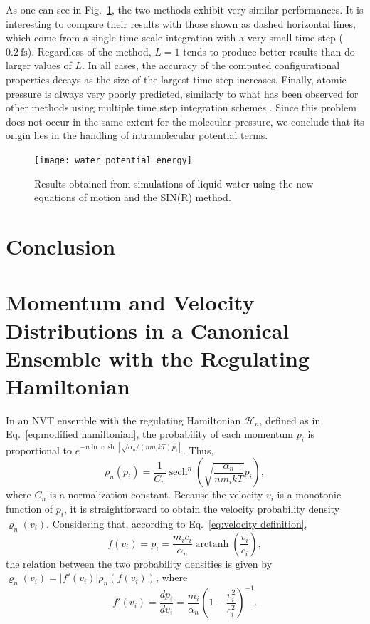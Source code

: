 \documentclass[
aip,
jcp,
reprint,
]{revtex4-1}
\DeclareMathOperator\arctanh{arctanh}
\DeclareMathOperator\sech{sech}
\newcommand{\nn}{n}
\begin{document}
As one can see in Fig.~\ref{fig:liquid water simulation results}, the two methods exhibit very similar performances.
It is interesting to compare their results with those shown as dashed horizontal lines, which come from a single-time scale integration with a very small time step ($0.2~\mathrm{fs}$).
Regardless of the method, $L=1$ tends to produce better results than do larger values of $L$.
In all cases, the accuracy of the computed configurational properties decays as the size of the largest time step increases.
Finally, atomic pressure is always very poorly predicted, similarly to what has been observed for other methods using multiple time step integration schemes \cite{Andoh_2017}.
Since this problem does not occur in the same extent for the molecular pressure, we conclude that its origin lies in the handling of intramolecular potential terms.

\begin{figure}[htbp!]
	\centering
	\texttt{[image: water\_potential\_energy]}
	\caption{Results obtained from simulations of liquid water using the new equations of motion and the SIN(R) method.}
	\label{fig:liquid water simulation results}
\end{figure}

\section{Conclusion}

\appendix

\section{Momentum and Velocity Distributions in a Canonical Ensemble with the Regulating Hamiltonian}
\label{sec:momentum and velocity distributions}

In an NVT ensemble with the regulating Hamiltonian ${\mathcal H}_\nn$, defined as in Eq.~\eqref{eq:modified hamiltonian}, the probability of each momentum $p_i$ is proportional to $e^{-\nn\ln\cosh\left[\sqrt{\alpha_\nn/(\nn m_i k T)} p_i\right]}$.
Thus,
\begin{equation*}
\rho_\nn(p_i) = \frac{1}{C_\nn} \sech^\nn\left(\sqrt{\frac{\alpha_\nn}{\nn m_i k T}} p_i\right),
\end{equation*}
where $C_\nn$ is a normalization constant.
Because the velocity $v_i$ is a monotonic function of $p_i$, it is straightforward to obtain the velocity probability density $\varrho_\nn(v_i)$.
Considering that, according to Eq.~\eqref{eq:velocity definition},
\begin{equation*}
f(v_i) = p_i = \frac{m_i c_i}{\alpha_\nn} \arctanh\left(\frac{v_i}{c_i}\right),
\end{equation*}
the relation between the two probability densities is given by $\varrho_\nn(v_i) = |f'(v_i)| \rho_\nn\left(f(v_i)\right)$, where
\begin{equation*}
f'(v_i) = \frac{dp_i}{d v_i} = \frac{m_i}{\alpha_\nn} \left(1-\frac{v_i^2}{c_i^2}\right)^{-1}.
\end{equation*}
\end{document}
